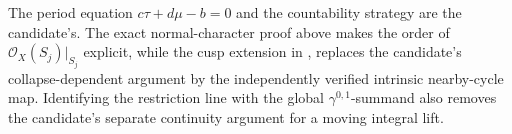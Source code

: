 \begin{remark}\hypertarget{tag-01TQ}{}\label{inv:wb:uniform-nontorsion-provenance}

The period equation \(c\tau+d\mu-b=0\) and the countability strategy are
the candidate's.  The exact normal-character proof above makes the order of
\(\mathcal O_X(S_j)|_{S_j}\) explicit, while the cusp extension in
,  replaces the candidate's
collapse-dependent argument by the independently verified intrinsic
nearby-cycle map.  Identifying the restriction line with the global
\(\gamma^{0,1}\)-summand also removes the candidate's separate continuity
argument for a moving integral lift.
\end{remark}

